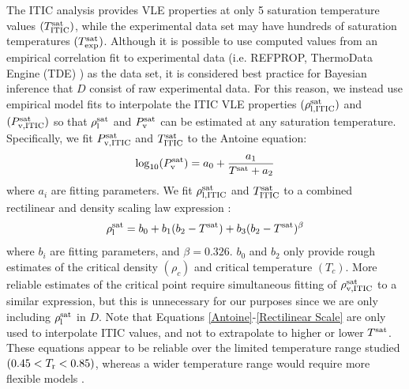 \documentclass[journal=jctc,manuscript=article]{achemso}
\begin{document}
The ITIC analysis provides VLE properties at only 5 saturation temperature values $(T^{\rm sat}_{\rm ITIC})$, while the experimental data set may have hundreds of saturation temperatures $(T^{\rm sat}_{\rm exp})$. Although it is possible to use computed values from an empirical correlation fit to experimental data (i.e. REFPROP, ThermoData Engine (TDE) \cite{TDE}) as the data set, it is considered best practice for Bayesian inference that $D$ consist of raw experimental data.
For this reason, we instead use empirical model fits to interpolate the ITIC VLE properties $(\rho_{\rm l, ITIC}^{\rm sat})$ and $(P_{\rm v, ITIC}^{\rm sat})$ so that $\rho_{\rm l}^{\rm sat}$ and $P_{\rm v}^{\rm sat}$ can be estimated at any saturation temperature. Specifically, we fit $P_{\rm v, ITIC}^{\rm sat}$ and $T^{\rm sat}_{\rm ITIC}$ to the Antoine equation:
\begin{equation} \label{Antoine}
\log_{\rm 10}(P_{\rm v}^{\rm sat}) = a_0 + \frac{a_1}{T^{\rm sat} + a_2}
\end{equation}
where $a_i$ are fitting parameters.
We fit $\rho_{\rm l, ITIC}^{\rm sat}$ and $T^{\rm sat}_{\rm ITIC}$ to a combined rectilinear and density scaling law expression \cite{Mess4}:
\begin{equation} \label{Rectilinear Scale}
\rho_{\rm l}^{\rm sat} = b_0 + b_1 (b_2 - T^{\rm sat}) + b_3 (b_2 - T^{\rm sat}) ^ {\beta}
\end{equation}
where $b_i$ are fitting parameters, and $\beta = 0.326$. $b_0$ and $b_2$ only provide rough estimates of the critical density $(\rho_c)$ and critical temperature $(T_c)$. More reliable estimates of the critical point require simultaneous fitting of $\rho_{\rm v, ITIC}^{\rm sat}$ to a similar expression, but this is unnecessary for our purposes since we are only including $\rho_{\rm l}^{\rm sat}$ in $D$. Note that Equations \ref{Antoine}-\ref{Rectilinear Scale} are only used to interpolate ITIC values, and not to extrapolate to higher or lower $T^{\rm sat}$. These equations appear to be reliable over the limited temperature range studied $(0.45 < T_{\rm r} < 0.85)$, whereas a wider temperature range would require more flexible models \cite{Riedel}. 
\end{document}
